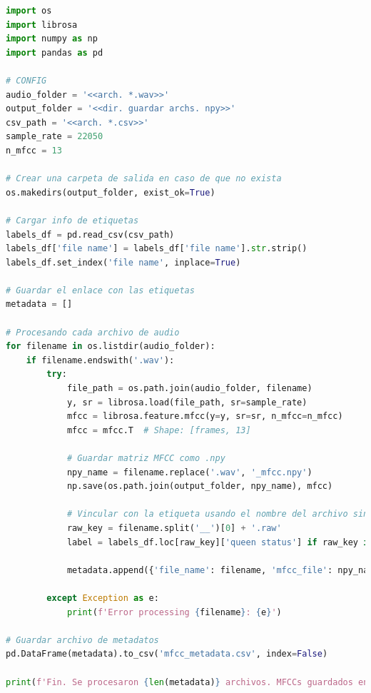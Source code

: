 \documentclass[12pt]{report}
\begin{document}
\begin{lstlisting}[language=Python, caption={Extracción de características.}, label={lst:FE_wavtonpy}]
import os
import librosa
import numpy as np
import pandas as pd

# CONFIG
audio_folder = '<<arch. *.wav>>'
output_folder = '<<dir. guardar archs. npy>>'
csv_path = '<<arch. *.csv>>'
sample_rate = 22050
n_mfcc = 13

# Crear una carpeta de salida en caso de que no exista
os.makedirs(output_folder, exist_ok=True)

# Cargar info de etiquetas
labels_df = pd.read_csv(csv_path)
labels_df['file name'] = labels_df['file name'].str.strip()
labels_df.set_index('file name', inplace=True)

# Guardar el enlace con las etiquetas
metadata = []

# Procesando cada archivo de audio
for filename in os.listdir(audio_folder):
    if filename.endswith('.wav'):
        try:
            file_path = os.path.join(audio_folder, filename)
            y, sr = librosa.load(file_path, sr=sample_rate)
            mfcc = librosa.feature.mfcc(y=y, sr=sr, n_mfcc=n_mfcc)
            mfcc = mfcc.T  # Shape: [frames, 13]

            # Guardar matriz MFCC como .npy
            npy_name = filename.replace('.wav', '_mfcc.npy')
            np.save(os.path.join(output_folder, npy_name), mfcc)

			# Vincular con la etiqueta usando el nombre del archivo sin el segmento
            raw_key = filename.split('__')[0] + '.raw'
            label = labels_df.loc[raw_key]['queen status'] if raw_key in labels_df.index else None

            metadata.append({'file_name': filename, 'mfcc_file': npy_name, 'queen_status': label})

        except Exception as e:
            print(f'Error processing {filename}: {e}')

# Guardar archivo de metadatos
pd.DataFrame(metadata).to_csv('mfcc_metadata.csv', index=False)

print(f'Fin. Se procesaron {len(metadata)} archivos. MFCCs guardados en '{output_folder}'')
\end{lstlisting}
\end{document}
